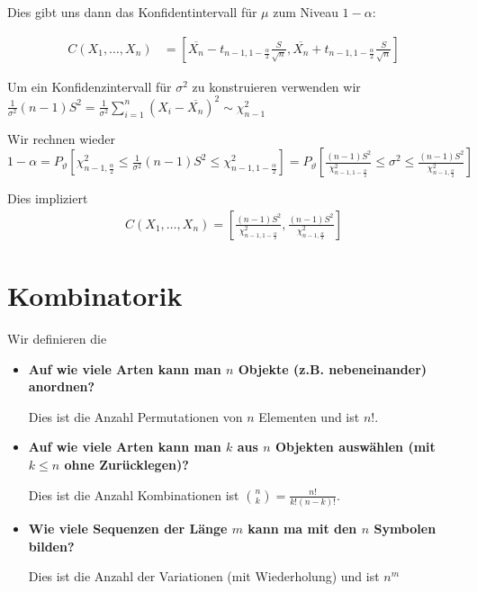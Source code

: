 \documentclass[25pt]{sciposter}
\begin{document}
\begin{multicols}{3}
Dies gibt uns dann das Konfidentintervall für $\mu$ zum Niveau $1-\alpha$:

\begin{align*}
C(X_1,\ldots,X_n) &= \left[ \overline{X_n} -t_{n-1,1-\frac{\alpha}{2}}\frac{S}{\sqrt{n}} , \overline{X_n} +t_{n-1,1-\frac{\alpha}{2}}\frac{S}{\sqrt{n}}   \right]
\end{align*}

Um ein Konfidenzintervall für $\sigma^2$ zu konstruieren verwenden wir $\frac{1}{\sigma^2} (n-1)S^2 = \frac{1}{\sigma^2}\sum_{i=1}^{n} (X_i- \overline{X_n})^2 \sim \chi_{n-1}^2$

Wir rechnen wieder $1-\alpha = P_{\vartheta} \left[ \chi_{n-1,\frac{\alpha}{2}}^2 \leq \frac{1}{\sigma^2} (n-1)S^2 \leq \chi_{n-1,1-\frac{\alpha}{2}}^2 \right] = P_{\vartheta} \left[ \frac{(n-1)S^2}{\chi_{n-1,1-\frac{\alpha}{2}}^2} \leq \sigma^2 \leq \frac{(n-1)S^2}{\chi_{n-1,\frac{\alpha}{2}}^2}  \right]$

Dies impliziert 
\begin{align*}
	C(X_1,\ldots,X_n) = \left[ \frac{(n-1)S^2}{\chi_{n-1,1-\frac{\alpha}{2}}^2} , \frac{(n-1)S^2}{\chi_{n-1,\frac{\alpha}{2}}^2}\right]
\end{align*}
\section {Kombinatorik}

Wir definieren die 

\begin{itemize}
	\item \textbf{Auf wie viele Arten kann man $n$ Objekte (z.B. nebeneinander) anordnen?}
	
	Dies ist die Anzahl Permutationen von $n$ Elementen und ist $n!$.
	
	
	\item 	\textbf{Auf wie viele Arten kann man $k$ aus $n$ Objekten auswählen (mit $k\leq n$ ohne Zurücklegen)?}
	
	Dies ist die Anzahl Kombinationen ist $\binom{n}{k} = \frac{n!}{k!(n-k)!}$.
	
	
	\item \textbf{Wie viele Sequenzen der Länge $m$ kann ma mit den $n$ Symbolen bilden?}
	
	Dies ist die Anzahl der Variationen (mit Wiederholung) und ist $n^m$
\end{itemize}










\end{multicols}
\end{document}
